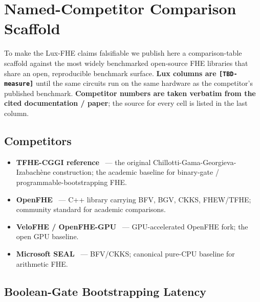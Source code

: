 \section{Named-Competitor Comparison Scaffold}
\label{sec:fhe-named-competitors}

To make the Lux-FHE claims falsifiable we publish here a comparison-table
scaffold against the most widely benchmarked open-source FHE libraries
that share an open, reproducible benchmark surface.
\textbf{Lux columns are \texttt{[TBD-measure]}} until the same circuits run
on the same hardware as the competitor's published benchmark.
\textbf{Competitor numbers are taken verbatim from the cited
documentation / paper}; the source for every cell is listed in the
last column.

\subsection{Competitors}

\begin{itemize}[nosep]
  \item \textbf{TFHE-CGGI reference}~\cite{cggi} --- the original
        Chillotti-Gama-Georgieva-Iza\-bach\`ene construction; the
        academic baseline for binary-gate / programmable-bootstrapping FHE.
  \item \textbf{OpenFHE}~\cite{albadawi2022openfhe} --- C++ library
        carrying BFV, BGV, CKKS, FHEW/TFHE; community standard for
        academic comparisons.
  \item \textbf{VeloFHE / OpenFHE-GPU}~\cite{velofhe2024} --- GPU-accelerated
        OpenFHE fork; the open GPU baseline.
  \item \textbf{Microsoft SEAL}~\cite{microsoftseal} --- BFV/CKKS;
        canonical pure-CPU baseline for arithmetic FHE.
\end{itemize}

\subsection{Boolean-Gate Bootstrapping Latency}

